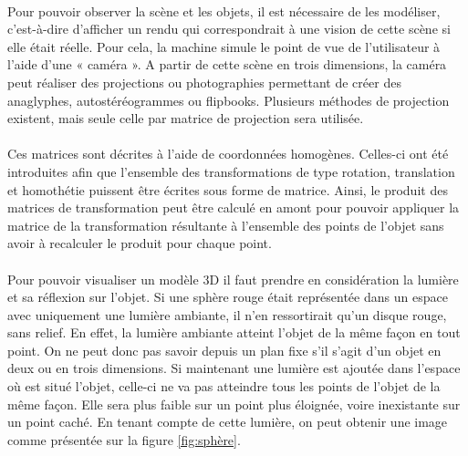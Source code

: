 \paragraph{}
	Pour pouvoir observer la scène et les objets, il est nécessaire de les modéliser, c'est-à-dire d'afficher un rendu qui correspondrait à une vision de cette scène si elle était réelle. Pour cela, la machine simule le point de vue de l'utilisateur à l'aide d'une « caméra ». A partir de cette scène en trois dimensions, la caméra peut réaliser des projections ou photographies permettant de créer des anaglyphes, autostéréogrammes ou flipbooks. Plusieurs méthodes de projection existent, mais seule celle par matrice de projection sera utilisée.

\paragraph{}
	Ces matrices sont décrites à l’aide de coordonnées homogènes. Celles-ci ont été introduites afin que l’ensemble des transformations de type rotation, translation et homothétie puissent être écrites sous forme de matrice. Ainsi, le produit des matrices de transformation peut être calculé en amont pour pouvoir appliquer la matrice de la transformation résultante à l’ensemble des points de l’objet sans avoir à recalculer le produit pour chaque point.

\paragraph{}
	Pour pouvoir visualiser un modèle 3D il faut prendre en considération la lumière et sa réflexion sur l’objet. Si une sphère rouge était représentée dans un espace avec uniquement une lumière ambiante, il n’en ressortirait qu’un disque rouge, sans relief. En effet, la lumière ambiante atteint l’objet de la même façon en tout point. On ne peut donc pas savoir depuis un plan fixe s’il s’agit d’un objet en deux ou en trois dimensions. Si maintenant une lumière est ajoutée dans l’espace où est situé l’objet, celle-ci ne va pas atteindre tous les points de l’objet de la même façon. Elle sera plus faible sur un point plus éloignée, voire inexistante sur un point caché. En tenant compte de cette lumière, on peut obtenir une image comme présentée sur la figure \ref{fig:sphère}.

